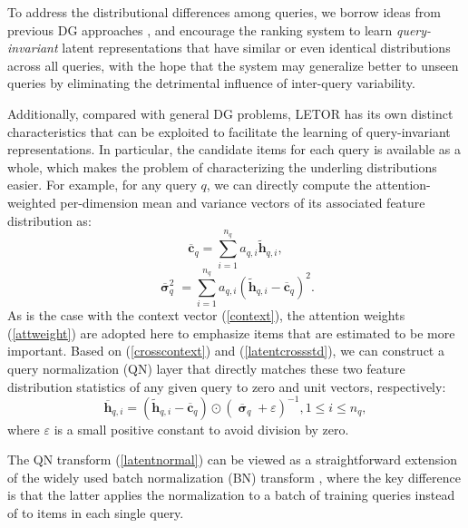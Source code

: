 \documentclass[letterpaper]{article}
\begin{document}
To address the distributional differences among queries, we borrow ideas from previous DG approaches \cite{ganin2016domain,motiian2017unified,muandet2013domain}, and encourage the ranking system to learn \textit{query-invariant} latent representations that have similar or even identical distributions across all queries, with the hope that the system may generalize better to unseen queries by eliminating the detrimental influence of inter-query variability.

Additionally, compared with general DG problems, LETOR has its own distinct characteristics that can be exploited to facilitate the learning of query-invariant representations. In particular, the candidate items for each query is available as a whole, which makes the problem of characterizing the underling distributions easier. For example, for any query $q$, we can directly compute the attention-weighted per-dimension mean and variance vectors of its associated feature distribution as:
\begin{equation}
\label{crosscontext}
{{\overline{\mathbf{c}}}_{q}}=\sum\limits_{i=1}^{{{n}_{q}}}{{{a}_{q,i}}{{\widetilde{\mathbf{h}}}_{q,i}}},
\end{equation}
\begin{equation}
\label{latentcrossstd}
\overline{\boldsymbol{\upsigma}}_{q}^{2}=\sum\limits_{i=1}^{{{n}_{q}}}{{{a}_{q,i}}{{\left( {{\widetilde{\mathbf{h}}}_{q,i}}-{{\overline{\mathbf{c}}}_{q}} \right)}^{2}}}.
\end{equation}
As is the case with the context vector (\ref{context}), the attention weights (\ref{attweight}) are adopted here to emphasize items that are estimated to be more important. Based on (\ref{crosscontext}) and (\ref{latentcrossstd}), we can construct a query normalization (QN) layer that directly matches these two feature distribution statistics of any given query to zero and unit vectors, respectively:
\begin{equation}
\label{latentnormal}
{{\overline{\mathbf{h}}}_{q,i}}=\left( {{\widetilde{\mathbf{h}}}_{q,i}}-{{\overline{\mathbf{c}}}_{q}} \right)\odot {{\left( {{\overline{\boldsymbol{\upsigma}}}_{q}}+\varepsilon  \right)}^{-1}},1\le i\le n_{q},
\end{equation}
where $\varepsilon$ is a small positive constant to avoid division by zero.

The QN transform (\ref{latentnormal}) can be viewed as a straightforward extension of the widely used batch normalization (BN) transform \cite{ioffe2015batch}, where the key difference is that the latter applies the normalization to a batch of training queries instead of to items in each single query.
\end{document}

